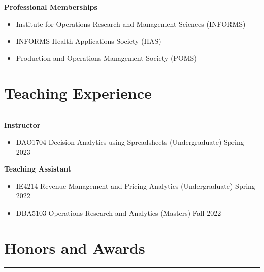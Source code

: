 \documentclass[12pt, a4paper]{article}
\begin{document}
{\raggedright\textbf{Professional Memberships}

\begin{itemize}[leftmargin=26pt, itemsep=2pt, parsep=0pt, topsep=-0.5em]
	\item Institute for Operations Research and Management Sciences (INFORMS)
	\item INFORMS Health Applications Society (HAS)
	\item Production and Operations Management Society (POMS)
\end{itemize}




\section*{Teaching Experience}
\vspace*{0.4em}
\hrule height 0.5pt

\raggedright\textbf{Instructor}
\begin{itemize}[leftmargin=26pt, itemsep=2pt, parsep=0pt, topsep=-0.5em]

	\item DAO1704 Decision Analytics using Spreadsheets (Undergraduate) \hfill Spring 2023

\end{itemize}

\raggedright\textbf{Teaching Assistant}
\begin{itemize}[leftmargin=26pt, itemsep=2pt, parsep=0pt, topsep=-0.5em]

	\item IE4214 Revenue Management and Pricing Analytics (Undergraduate) \hfill Spring 2022

	\item DBA5103 Operations Research and Analytics (Masters) \hfill Fall 2022

\end{itemize}




\section*{Honors and Awards}
\vspace*{0.4em}
\hrule height 0.5pt
\begin{itemize}[leftmargin=26pt, itemsep=1pt, parsep=0.5pt, topsep=1pt]


\end{itemize}}
\end{document}
